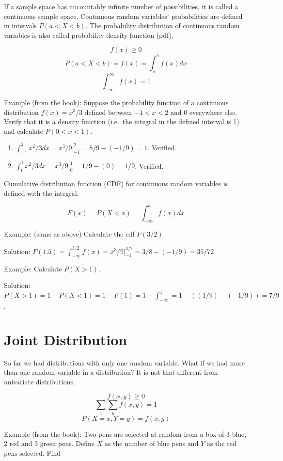 \documentclass[]{book}
\providecommand{\tightlist}{%
  \setlength{\itemsep}{0pt}\setlength{\parskip}{0pt}}
\theoremstyle{definition}
\theoremstyle{definition}
\theoremstyle{definition}
\theoremstyle{remark}
\begin{document}
If a sample space has uncountably infinite number of possibilities, it
is called a continuous sample space. Continuous random variables'
probabilities are defined in intervals \(P(a < X < b)\). The probability
distribution of continuous random variables is also called probability
density function (pdf).

\[f(x) \ge 0\] \[ P(a < X < b) = f(x) = \int_a^b f(x)dx\]
\[\int_{- \infty}^\infty f(x) = 1\]

Example (from the book): Suppose the probability function of a
continuous distribution \(f(x) = x^2/3\) defined between \(-1 < x < 2\)
and \(0\) everywhere else. Verify that it is a density function
(i.e.~the integral in the defined interval is 1) and calculate
\(P(0 < x < 1)\).

\begin{enumerate}
\def\labelenumi{\alph{enumi}.}
\tightlist
\item
  \(\int_{-1}^2 x^2/3 dx = x^3/9|_{-1}^2 = 8/9 - (-1/9) = 1\). Verified.
\item
  \(\int_{0}^1 x^2/3 dx = x^3/9|_{0}^1 = 1/9 - (0) = 1/9\). Verified.
\end{enumerate}

Cumulative distribution function (CDF) for continuous random variables
is defined with the integral.

\[F(x) = P(X < x) = \int_{- \infty}^a f(x)dx\]

Example: (same as above) Calculate the cdf \(F(3/2)\)

Solution:
\(F(1.5) = \int_{- \infty}^{3/2} f(x) = x^3/9|_{-1}^{3/2} = 3/8 - (-1/9) = 35/72\)

Example: Calculate \(P(X > 1)\).

Solution:
\(P(X > 1) = 1 - P(X < 1) = 1 - F(1) = 1 - \int_{- \infty}^{1} = 1 - ((1/9) - (-1/9)) = 7/9\).

\hypertarget{joint-distribution}{%
\section{Joint Distribution}\label{joint-distribution}}

So far we had distributions with only one random variable. What if we
had more than one random variable in a distribution? It is not that
different from univariate distributions.

\[f(x,y) \ge 0\] \[\sum_x\sum_y f(x,y) = 1\] \[P(X=x,Y=y) = f(x,y)\]

Example (from the book): Two pens are selected at random from a box of 3
blue, 2 red and 3 green pens. Define \(X\) as the number of blue pens
and \(Y\) as the red pens selected. Find
\end{document}
